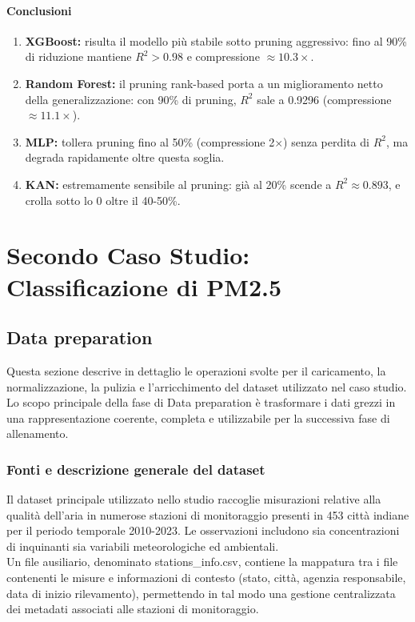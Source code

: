 \documentclass[a4paper,12pt]{report}
\begin{document}
	\subsubsection{Conclusioni}
	\begin{enumerate}
		\item \textbf{XGBoost:} risulta il modello più stabile sotto pruning aggressivo: fino al 90\% di riduzione mantiene \(R^2 > 0.98\) e compressione \(\approx 10.3\times\).
		\item \textbf{Random Forest:} il pruning rank-based porta a un miglioramento netto della generalizzazione: con 90\% di pruning, \(R^2\) sale a 0.9296 (compressione \(\approx 11.1\times\)).
		\item \textbf{MLP:} tollera pruning fino al 50\% (compressione 2$\times$) senza perdita di \(R^2\), ma degrada rapidamente oltre questa soglia.
		\item \textbf{KAN:} estremamente sensibile al pruning: già al 20\% scende a \(R^2 \approx 0.893\), e crolla sotto lo 0 oltre il 40-50\%.
	\end{enumerate}
	
	\chapter{Secondo Caso Studio: Classificazione di PM2.5}
	
	\section{Data preparation}
	
	Questa sezione descrive in dettaglio le operazioni svolte per il caricamento, la normalizzazione, la pulizia e l'arricchimento del dataset utilizzato nel caso studio. Lo scopo principale della fase di Data preparation è trasformare i dati grezzi in una rappresentazione coerente, completa e utilizzabile per la successiva fase di allenamento.
	
	\subsection{Fonti e descrizione generale del dataset}
	Il dataset principale utilizzato nello studio raccoglie misurazioni relative alla qualità dell'aria in numerose stazioni di monitoraggio presenti in 453 città indiane per il periodo temporale 2010-2023. Le osservazioni includono sia concentrazioni di inquinanti sia variabili meteorologiche ed ambientali.\\
	Un file ausiliario, denominato stations\_info.csv, contiene la mappatura tra i file contenenti le misure e informazioni di contesto (stato, città, agenzia responsabile, data di inizio rilevamento), permettendo in tal modo una gestione centralizzata dei metadati associati alle stazioni di monitoraggio.
	
\end{document}
